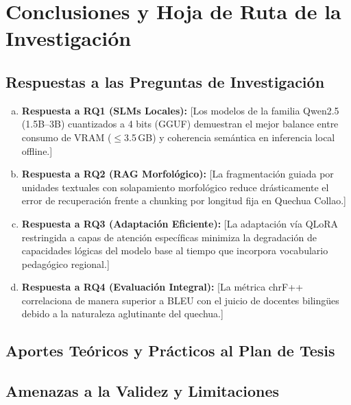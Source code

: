 
\section{Conclusiones y Hoja de Ruta de la Investigación}
\label{sec:conclusiones_roadmap}

\subsection{Respuestas a las Preguntas de Investigación}
\begin{enumerate}[(a)]
	\item \textbf{Respuesta a RQ1 (SLMs Locales):} [Los modelos de la familia Qwen2.5 (1.5B--3B) cuantizados a 4 bits (GGUF) demuestran el mejor balance entre consumo de VRAM ($\le$3.5\,GB) y coherencia semántica en inferencia local offline.]
	\item \textbf{Respuesta a RQ2 (RAG Morfológico):} [La fragmentación guiada por unidades textuales con solapamiento morfológico reduce drásticamente el error de recuperación frente a chunking por longitud fija en Quechua Collao.]
	\item \textbf{Respuesta a RQ3 (Adaptación Eficiente):} [La adaptación vía QLoRA restringida a capas de atención específicas minimiza la degradación de capacidades lógicas del modelo base al tiempo que incorpora vocabulario pedagógico regional.]
	\item \textbf{Respuesta a RQ4 (Evaluación Integral):} [La métrica chrF++ correlaciona de manera superior a BLEU con el juicio de docentes bilingües debido a la naturaleza aglutinante del quechua.]
\end{enumerate}

\subsection{Aportes Teóricos y Prácticos al Plan de Tesis}

\subsection{Amenazas a la Validez y Limitaciones}

